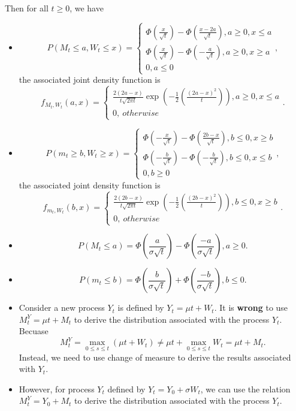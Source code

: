 \begin{refsection}
\begin{lemma}
	Then for all $t\geq 0$, we have
	\begin{itemize}
		\item $$P(M_t\leq a, W_t\leq x) = \begin{cases*}
		\Phi(\frac{x}{\sqrt{t}}) - \Phi(\frac{x - 2a}{\sqrt{t}}), a\geq 0, x\leq a\\
		\Phi(\frac{x}{\sqrt{t}}) - \Phi(-\frac{a}{\sqrt{t}}), a\geq 0, x\geq a\\
		0, a\leq 0
		\end{cases*},$$
		the associated joint density function is 
		$$f_{M_t,W_t}(a,x) = \begin{cases*}
		\frac{2(2a - x)}{t\sqrt{2\pi t}} \exp(-\frac{1}{2}(\frac{(2a-x)^2}{t})), a\geq 0, x\leq a\\
		0, ~otherwise
		\end{cases*}.$$
		\item $$P(m_t\geq b, W_t\geq x) = \begin{cases*}
		\Phi(-\frac{x}{\sqrt{t}}) - \Phi(\frac{2b - x}{\sqrt{t}}), b\leq 0, x\geq b\\
		\Phi(-\frac{b}{\sqrt{t}}) - \Phi(-\frac{b}{\sqrt{t}}), b\leq 0, x\leq b\\
		0, b\geq 0
		\end{cases*},$$
		the associated joint density function is 
		$$f_{m_t,W_t}(b,x) = \begin{cases*}
		\frac{2(2b - x)}{t\sqrt{2\pi t}} \exp(-\frac{1}{2}(\frac{(2b-x)^2}{t})), b\leq 0, x\geq b\\
		0, ~otherwise
		\end{cases*}.$$
		\item 
		$$P(M_t \leq a) = \Phi(\frac{a}{\sigma \sqrt{t}}) - \Phi(\frac{-a }{\sigma \sqrt{t}}), a\geq 0.$$
		\item
		$$P(m_t \leq b) = \Phi(\frac{b}{\sigma \sqrt{t}}) + \Phi(\frac{-b}{\sigma \sqrt{t}}), b\leq 0.$$
	\end{itemize}	
\end{lemma}


\begin{note}\hfill
	\begin{itemize}
		\item Consider a new process $Y_t$ is defined by 
		$Y_t = \mu t + W_t$. It is \textbf{wrong} to use
		$M_t^Y = \mu t + M_t$ to derive the distribution associated with the process $Y_t$. Becuase
		$$M_t^Y = \max_{0\leq s\leq t} (\mu t + W_t) \neq \mu t +\max_{0\leq s\leq t}  W_t = \mu t + M_t.$$
		Instead, we need to use change of measure to derive the results associated with $Y_t$.
		\item However, for process $Y_t$ defined by 
		$Y_t = Y_0 + \sigma W_t$, we can use the relation
		$M_t^Y = Y_0 + M_t$ to derive the distribution associated with the process $Y_t$.
		

\end{itemize}
\end{note}
\end{refsection}
